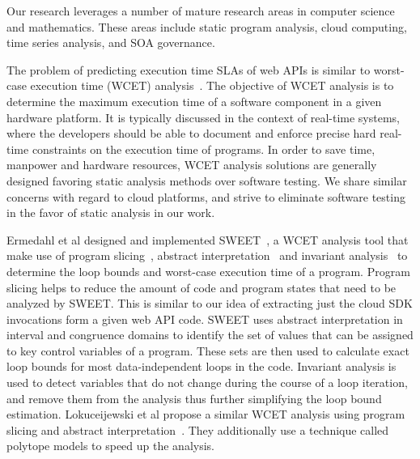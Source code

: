 Our research leverages a number of mature research areas in computer 
science and mathematics. These areas include static program analysis, 
cloud computing, time series analysis,
and SOA governance.

The problem of predicting execution time SLAs of web APIs 
is similar to worst-case execution
time (WCET) analysis~\cite{Wilhelm:2008:WEP:1347375.1347389,ermedahl2007loop,Sandberg:2006:FWF:1134650.1134666,Muchnick:1998:ACD:286076,Frost:2011:WAJ:2043910.2043916}. 
The objective of WCET analysis is to determine the maximum execution time of a software component in a given hardware platform. It is 
typically discussed in the context of real-time systems, where the developers should be able to document
and enforce precise hard real-time constraints on the execution time of programs. In order to save time, 
manpower and hardware resources, WCET analysis solutions are generally designed favoring static
analysis methods over software testing. We share similar concerns with regard to cloud platforms,
and strive to eliminate software testing in the favor of static analysis in our work. 

Ermedahl et al designed and implemented SWEET~\cite{ermedahl2007loop}, a WCET analysis tool that make use of program slicing~\cite{Sandberg:2006:FWF:1134650.1134666},
 abstract interpretation~\cite{Cousot:1977:AIU:512950.512973} and invariant analysis~\cite{Muchnick:1998:ACD:286076} to determine the loop bounds and worst-case execution time 
 of a program. Program slicing helps to reduce the amount of code and program states that need to be 
 analyzed by SWEET. This is similar to our idea of extracting just the cloud SDK invocations form 
 a given web API code. SWEET uses abstract interpretation in interval and congruence domains to identify
 the set of values that can be assigned to key control variables of a program. These sets are then
 used to calculate exact loop bounds for most data-independent loops in the code. Invariant analysis  is
 used to detect variables that do not change during the course of a loop iteration, and remove them from
 the analysis thus further simplifying the loop bound estimation. Lokuceijewski et al propose 
 a similar WCET analysis using program slicing and abstract interpretation~\cite{Lokuciejewski:2009:FPS:1545006.1545064}. They additionally use a technique
called polytope models to speed up the analysis.  
 
